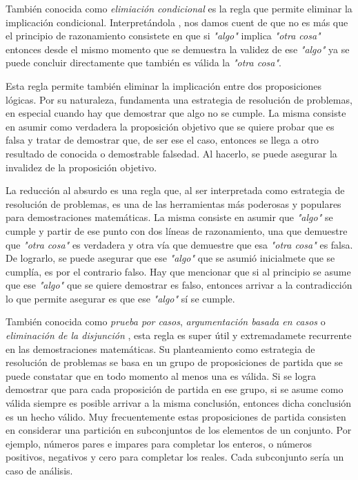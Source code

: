 También conocida como \textit{elimiación condicional} es la regla que permite eliminar la implicación condicional. Interpretándola , nos damos cuent de que no es más que el principio de razonamiento consistete en que si \textit{"algo"} implica \textit{"otra cosa"} entonces desde el mismo momento que se demuestra la validez de ese \textit{"algo"} ya se puede concluir directamente que también es válida la \textit{"otra cosa"}.



Esta regla permite también eliminar la implicación entre dos proposiciones lógicas. Por su naturaleza, fundamenta una estrategia de resolución de problemas, en especial cuando hay que demostrar que algo no se cumple. La misma consiste en asumir como verdadera la proposición objetivo que se quiere probar que es falsa y tratar de demostrar que, de ser ese el caso, entonces se llega a otro resultado de conocida o demostrable falsedad. Al hacerlo, se puede asegurar la invalidez de la proposición objetivo.



La reducción al absurdo es una regla que, al ser interpretada como estrategia de resolución de problemas, es una de las herramientas más poderosas y populares para demostraciones matemáticas. La misma consiste en asumir que \textit{"algo"} se cumple y partir de ese punto con dos líneas de razonamiento, una que demuestre que \textit{"otra cosa"} es verdadera y otra vía que demuestre que esa \textit{"otra cosa"} es falsa. De lograrlo, se puede asegurar que ese \textit{"algo"} que se asumió inicialmete que se cumplía, es por el contrario falso. Hay que mencionar que si al principio se asume que ese \textit{"algo"} que se quiere demostrar es falso, entonces arrivar a la contradicción lo que permite asegurar es que ese \textit{"algo"} sí se cumple.



También conocida como \textit{prueba por casos}, \textit{argumentación basada en casos} o \textit{eliminación de la disjunción} , esta regla es super útil y extremadamete recurrente en las demostraciones matemáticas. Su planteamiento como estrategia de resolución de problemas se basa en un grupo de proposiciones de partida que se puede constatar que en todo momento al menos una es válida. Si se logra demostrar que para cada proposición de partida en ese grupo, si se asume como válida siempre es posible arrivar a la misma conclusión, entonces dicha conclusión es un hecho válido. Muy frecuentemente estas proposiciones de partida consisten en considerar una partición en subconjuntos de los elementos de un conjunto. Por ejemplo, números pares e impares para completar los enteros, o números positivos, negativos y cero para completar los reales. Cada subconjunto sería un caso de análisis.


